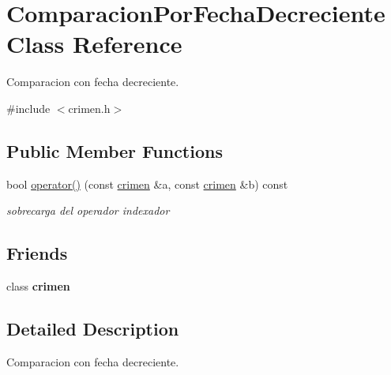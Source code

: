 \hypertarget{classComparacionPorFechaDecreciente}{\section{Comparacion\-Por\-Fecha\-Decreciente Class Reference}
\label{classComparacionPorFechaDecreciente}
}


Comparacion con fecha decreciente.  




{\ttfamily \#include $<$crimen.\-h$>$}

\subsection*{Public Member Functions}
\begin{DoxyCompactItemize}
\item 
bool \hyperlink{classComparacionPorFechaDecreciente_aa34cc3fe0199fb275bfe9f32fa6e3a35}{operator()} (const \hyperlink{classcrimen}{crimen} \&a, const \hyperlink{classcrimen}{crimen} \&b) const 
\begin{DoxyCompactList}\small\item\em sobrecarga del operador indexador \end{DoxyCompactList}\end{DoxyCompactItemize}
\subsection*{Friends}
\begin{DoxyCompactItemize}
\item 
\hypertarget{classComparacionPorFechaDecreciente_a95cf0cce33343b561a43ff7566515870}{class {\bfseries crimen}}\label{classComparacionPorFechaDecreciente_a95cf0cce33343b561a43ff7566515870}

\end{DoxyCompactItemize}


\subsection{Detailed Description}
Comparacion con fecha decreciente. 


